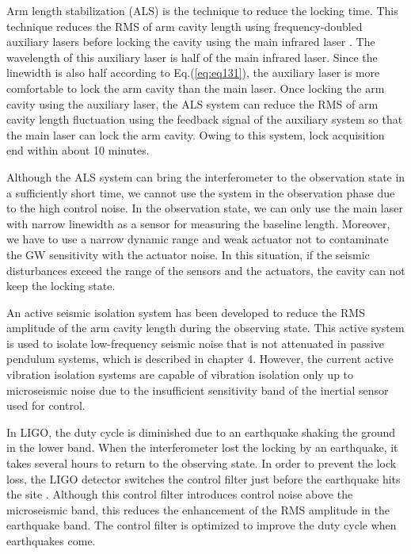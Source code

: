 Arm length stabilization (ALS) is the technique to reduce the locking time. This technique reduces the RMS of arm cavity length using frequency-doubled auxiliary lasers before locking the cavity using the main infrared laser \cite{mullavey2012arm,izumi2012multi}. The wavelength of this auxiliary laser is half of the main infrared laser. Since the linewidth is also half according to Eq.(\ref{eq:eq131}), the auxiliary laser is more comfortable to lock the arm cavity than the main laser. Once locking the arm cavity using the auxiliary laser, the ALS system can reduce the RMS of arm cavity length fluctuation using the feedback signal of the auxiliary system so that the main laser can lock the arm cavity. Owing to this system, lock acquisition end within about 10 minutes.

Although the ALS system can bring the interferometer to the observation state in a sufficiently short time, we cannot use the system in the observation phase due to the high control noise. In the observation state, we can only use the main laser with narrow linewidth as a sensor for measuring the baseline length. Moreover, we have to use a narrow dynamic range and weak actuator not to contaminate the GW sensitivity with the actuator noise. In this situation, if the seismic disturbances exceed the range of the sensors and the actuators, the cavity can not keep the locking state.

An active seismic isolation system has been developed to reduce the RMS amplitude of the arm cavity length during the observing state.  This active system is used to isolate low-frequency seismic noise that is not attenuated in passive pendulum systems, which is described in chapter 4. However, the current active vibration isolation systems are capable of vibration isolation only up to microseismic noise due to the insufficient sensitivity band of the inertial sensor used for control.

In LIGO, the duty cycle is diminished due to an earthquake shaking the ground in the lower band. When the interferometer lost the locking by an earthquake, it takes several hours to return to the observing state. In order to prevent the lock loss, the LIGO detector switches the control filter just before the earthquake hits the site \cite{Biscans2018control}. Although this control filter introduces control noise above the microseismic band, this reduces the enhancement of the RMS amplitude in the earthquake band. The control filter is optimized to improve the duty cycle when earthquakes come.

